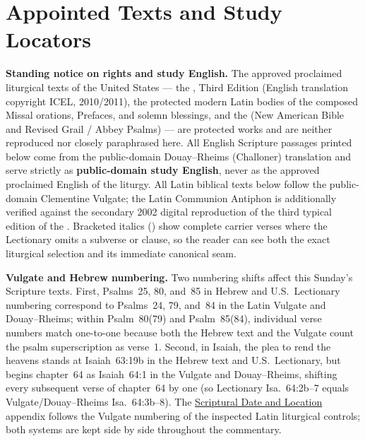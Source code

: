 \section{Appointed Texts and Study Locators}

\noindent\textbf{Standing notice on rights and study English.}
The approved proclaimed liturgical texts of the United States --- the , Third Edition (English translation copyright ICEL, 2010/2011), the protected modern Latin bodies of the composed Missal orations, Prefaces, and solemn blessings, and the  (New American Bible and Revised Grail / Abbey Psalms) --- are protected works and are neither reproduced nor closely paraphrased here. All English Scripture passages printed below come from the public-domain Douay--Rheims (Challoner) translation and serve strictly as \textbf{public-domain study English}, never as the approved proclaimed English of the liturgy. All Latin biblical texts below follow the public-domain Clementine Vulgate; the Latin Communion Antiphon is additionally verified against the secondary 2002 digital reproduction of the third typical edition of the . Bracketed italics () show complete carrier verses where the Lectionary omits a subverse or clause, so the reader can see both the exact liturgical selection and its immediate canonical seam.

\medskip
\noindent\textbf{Vulgate and Hebrew numbering.}
Two numbering shifts affect this Sunday's Scripture texts. First, Psalms~25, 80, and~85 in Hebrew and U.S.\ Lectionary numbering correspond to Psalms~24, 79, and~84 in the Latin Vulgate and Douay--Rheims; within Psalm~80(79) and Psalm~85(84), individual verse numbers match one-to-one because both the Hebrew text and the Vulgate count the psalm superscription as verse~1. Second, in Isaiah, the plea to rend the heavens stands at Isaiah~63:19b in the Hebrew text and U.S.\ Lectionary, but begins chapter~64 as Isaiah~64:1 in the Vulgate and Douay--Rheims, shifting every subsequent verse of chapter~64 by one (so Lectionary Isa.~64:2b--7 equals Vulgate/Douay--Rheims Isa.~64:3b--8). The \hyperref[sec:date-location]{Scriptural Date and Location} appendix follows the Vulgate numbering of the inspected Latin liturgical controls; both systems are kept side by side throughout the commentary.

